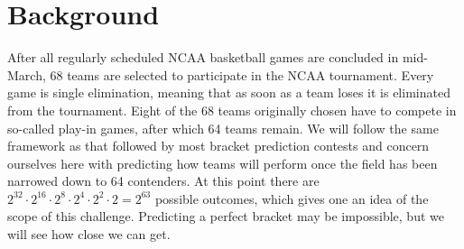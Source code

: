 \documentclass[10pt,a4paper, hidelinks]{article} %
\begin{document}
\pagestyle{plain} 
\title{\rmfamily\normalfont{}}
\author{}
\date{} %

\maketitle

\begin{abstract}
	Every year, millions of people fill out March Madness brackets in attempt to predict the outcome of the NCAA men's basketball tournament. A big part of the draw is that the tournament is notoriously difficult to predict, and predicting a perfect bracket is so improbable that Warren Buffet, a US investor, annually offers \$1MM a year for life to any of his employees who can predict the exact outcome of the tournament. Many algorithms for predicting the tournament attempt to predict results at the individual game level, based on how teams match up with one another. We will instead focus on predicting how many rounds a team will progress in the tournament based on its performance over the course of the preceding season, with the goal of building stable predictions and successfully predicting tournament outcomes.
\end{abstract}

\tableofcontents
\newpage

\section{Background}
After all regularly scheduled NCAA basketball games are concluded in mid-March, 68 teams are selected to participate in the NCAA tournament. Every game is single elimination, meaning that as soon as a team loses it is eliminated from the tournament. Eight of the 68 teams originally chosen have to compete in so-called play-in games, after which 64 teams remain. We will follow the same framework as that followed by most bracket prediction contests and concern ourselves here with predicting how teams will perform once the field has been narrowed down to 64 contenders. At this point there are $2^{32} \cdot 2^{16} \cdot 2^8 \cdot 2^4 \cdot 2^2 \cdot 2 = 2^{63}$ possible outcomes, which gives one an idea of the scope of this challenge. Predicting a perfect bracket may be impossible, but we will see how close we can get.
\end{document}

